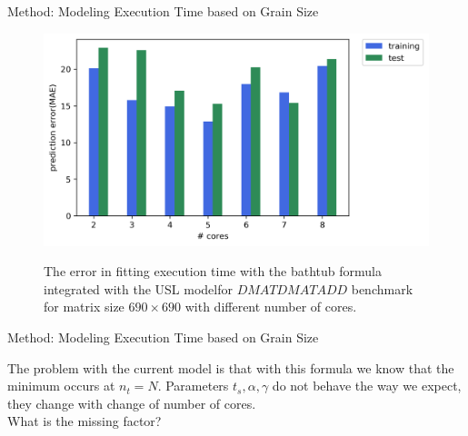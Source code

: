 \documentclass[10pt]{beamer}
\begin{document}
\begin{frame}{Method: Modeling Execution Time based on Grain Size}
	\begin{outline}	
\begin{figure}[]
		{\includegraphics[scale=.7]{images/bathtub/error_final_690mae.png}}	
	\caption{The error in fitting execution time with the bathtub formula integrated with the USL modelfor $DMATDMATADD$ benchmark for matrix size $690\times690$ with different number of cores.}	
	\label{fig25}
\end{figure}
\end{outline}
\end{frame}

\begin{frame}{Method: Modeling Execution Time based on Grain Size}
	\begin{outline}	
\1The problem with the current model is that with this formula we know that the minimum occurs at $n_t=N$.
\1Parameters $t_s, \alpha, \gamma$ do not behave the way we expect, they change with change of number of cores.
\\
What is the missing factor?

\end{outline}
\end{frame}


\end{document}
